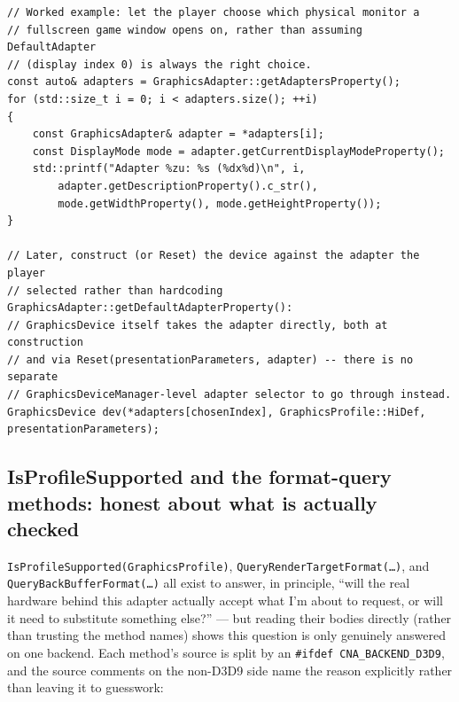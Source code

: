 \begin{lstlisting}
// Worked example: let the player choose which physical monitor a
// fullscreen game window opens on, rather than assuming DefaultAdapter
// (display index 0) is always the right choice.
const auto& adapters = GraphicsAdapter::getAdaptersProperty();
for (std::size_t i = 0; i < adapters.size(); ++i)
{
    const GraphicsAdapter& adapter = *adapters[i];
    const DisplayMode mode = adapter.getCurrentDisplayModeProperty();
    std::printf("Adapter %zu: %s (%dx%d)\n", i,
        adapter.getDescriptionProperty().c_str(),
        mode.getWidthProperty(), mode.getHeightProperty());
}

// Later, construct (or Reset) the device against the adapter the player
// selected rather than hardcoding GraphicsAdapter::getDefaultAdapterProperty():
// GraphicsDevice itself takes the adapter directly, both at construction
// and via Reset(presentationParameters, adapter) -- there is no separate
// GraphicsDeviceManager-level adapter selector to go through instead.
GraphicsDevice dev(*adapters[chosenIndex], GraphicsProfile::HiDef, presentationParameters);
\end{lstlisting}

\subsection{IsProfileSupported and the format-query methods: honest about what is actually checked}
\label{sec:adapter-format-queries}

\texttt{IsProfileSupported(GraphicsProfile)}, \texttt{QueryRenderTargetFormat(\ldots)}, and
\texttt{QueryBackBufferFormat(\ldots)} all exist to answer, in principle, ``will the real
hardware behind this adapter actually accept what I'm about to request, or will it need to
substitute something else?'' --- but reading their bodies directly (rather than trusting the
method names) shows this question is only genuinely answered on one backend. Each method's
source is split by an \texttt{\#ifdef CNA\_BACKEND\_D3D9}, and the source comments on the
non-D3D9 side name the reason explicitly rather than leaving it to guesswork:


